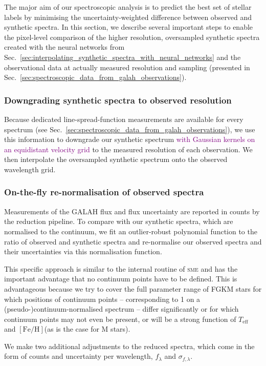 \documentclass[
  journal=pasa,
  manuscript=research-paper, %
  year=2024,
  volume=37
]{cup-journal}
\newcommand{\adjusted}[1]{{\textcolor{purple}{#1}}}
\newcommand{\Teff}{$T_\mathrm{eff}$\xspace}
\newcommand{\feh}{$\mathrm{[Fe/H]}$\xspace}
\newcommand{\sme}{\textsc{sme}\xspace}
\begin{document}
The major aim of our spectroscopic analysis is to predict the best set of stellar labels by minimising the uncertainty-weighted difference between observed and synthetic spectra. In this section, we describe several important steps to enable the pixel-level comparison of the higher resolution, oversampled synthetic spectra created with the neural networks from Sec.~\ref{sec:interpolating_synthetic_spectra_with_neural_networks} and the observational data at actually measured resolution and sampling (presented in Sec.~\ref{sec:spectroscopic_data_from_galah_observations}).

\subsubsection{Downgrading synthetic spectra to observed resolution}

Because dedicated line-spread-function measurements are available for every spectrum (see Sec.~\ref{sec:spectroscopic_data_from_galah_observations}), we use this information to downgrade our synthetic spectrum \adjusted{with Gaussian kernels on an equidistant velocity grid} to the measured resolution of each observation. We then interpolate the oversampled synthetic spectrum onto the observed wavelength grid.

\subsubsection{On-the-fly re-normalisation of observed spectra}

Measurements of the GALAH flux and flux uncertainty are reported in counts by the reduction pipeline. To compare with our synthetic spectra, which are normalised to the continuum, we fit an outlier-robust polynomial function to the ratio of observed and synthetic spectra and re-normalise our observed spectra and their uncertainties via this normalisation function.

This specific approach is similar to the internal routine of \sme and has the important advantage that no continuum points have to be defined. This is advantageous because we try to cover the full parameter range of FGKM stars for which positions of continuum points -- corresponding to 1 on a (pseudo-)continuum-normalised spectrum -- differ significantly or for which continuum points may not even be present, or will be a strong function of \Teff and \feh (as is the case for M stars).

We make two additional adjustments to the reduced spectra, which come in the form of counts and uncertainty per wavelength, $f_\lambda$ and $\sigma_{f,\lambda}$.
\end{document}
